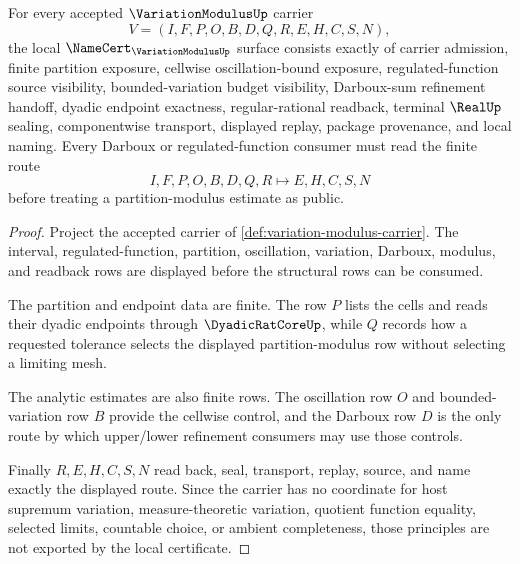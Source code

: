 \begin{theorem}
\label{thm:variation-modulus-namecert-obligations}
For every accepted $\VariationModulusUp$ carrier
$$
V=(I,F,P,O,B,D,Q,R,E,H,C,S,N),
$$
the local $\NameCert_{\VariationModulusUp}$ surface consists exactly of carrier admission, finite partition exposure, cellwise oscillation-bound exposure, regulated-function source visibility, bounded-variation budget visibility, Darboux-sum refinement handoff, dyadic endpoint exactness, regular-rational readback, terminal $\RealUp$ sealing, componentwise transport, displayed replay, package provenance, and local naming. Every Darboux or regulated-function consumer must read the finite route
$$
I,F,P,O,B,D,Q,R \longmapsto E,H,C,S,N
$$
before treating a partition-modulus estimate as public.
\end{theorem}
\begin{proof}
Project the accepted carrier of \autoref{def:variation-modulus-carrier}. The interval, regulated-function, partition, oscillation, variation, Darboux, modulus, and readback rows are displayed before the structural rows can be consumed.

The partition and endpoint data are finite. The row $P$ lists the cells and reads their dyadic endpoints through $\DyadicRatCoreUp$, while $Q$ records how a requested tolerance selects the displayed partition-modulus row without selecting a limiting mesh.

The analytic estimates are also finite rows. The oscillation row $O$ and bounded-variation row $B$ provide the cellwise control, and the Darboux row $D$ is the only route by which upper/lower refinement consumers may use those controls.

Finally $R,E,H,C,S,N$ read back, seal, transport, replay, source, and name exactly the displayed route. Since the carrier has no coordinate for host supremum variation, measure-theoretic variation, quotient function equality, selected limits, countable choice, or ambient completeness, those principles are not exported by the local certificate.
\end{proof}

